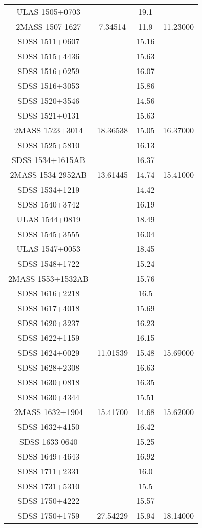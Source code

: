 \begin{table}
\begin{tabular}{cccc}
ULAS 1505+0703 &  & 19.1 &  \\
2MASS 1507-1627 & 7.34514 & 11.9 & 11.23000 \\
SDSS 1511+0607 &  & 15.16 &  \\
SDSS 1515+4436 &  & 15.63 &  \\
SDSS 1516+0259 &  & 16.07 &  \\
SDSS 1516+3053 &  & 15.86 &  \\
SDSS 1520+3546 &  & 14.56 &  \\
SDSS 1521+0131 &  & 15.63 &  \\
2MASS 1523+3014 & 18.36538 & 15.05 & 16.37000 \\
SDSS 1525+5810 &  & 16.13 &  \\
SDSS 1534+1615AB &  & 16.37 &  \\
2MASS 1534-2952AB & 13.61445 & 14.74 & 15.41000 \\
SDSS 1534+1219 &  & 14.42 &  \\
SDSS 1540+3742 &  & 16.19 &  \\
ULAS 1544+0819 &  & 18.49 &  \\
SDSS 1545+3555 &  & 16.04 &  \\
ULAS 1547+0053 &  & 18.45 &  \\
SDSS 1548+1722 &  & 15.24 &  \\
2MASS 1553+1532AB &  & 15.76 &  \\
SDSS 1616+2218 &  & 16.5 &  \\
SDSS 1617+4018 &  & 15.69 &  \\
SDSS 1620+3237 &  & 16.23 &  \\
SDSS 1622+1159 &  & 16.15 &  \\
SDSS 1624+0029 & 11.01539 & 15.48 & 15.69000 \\
SDSS 1628+2308 &  & 16.63 &  \\
SDSS 1630+0818 &  & 16.35 &  \\
SDSS 1630+4344 &  & 15.51 &  \\
2MASS 1632+1904 & 15.41700 & 14.68 & 15.62000 \\
SDSS 1632+4150 &  & 16.42 &  \\
SDSS 1633-0640 &  & 15.25 &  \\
SDSS 1649+4643 &  & 16.92 &  \\
SDSS 1711+2331 &  & 16.0 &  \\
SDSS 1731+5310 &  & 15.5 &  \\
SDSS 1750+4222 &  & 15.57 &  \\
SDSS 1750+1759 & 27.54229 & 15.94 & 18.14000 \\

\end{tabular}
\end{table}
